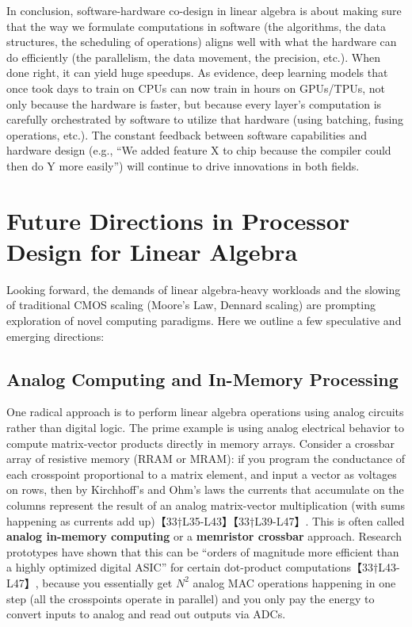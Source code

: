 In conclusion, software-hardware co-design in linear algebra is about making sure that the way we formulate computations in software (the algorithms, the data structures, the scheduling of operations) aligns well with what the hardware can do efficiently (the parallelism, the data movement, the precision, etc.). When done right, it can yield huge speedups. As evidence, deep learning models that once took days to train on CPUs can now train in hours on GPUs/TPUs, not only because the hardware is faster, but because every layer’s computation is carefully orchestrated by software to utilize that hardware (using batching, fusing operations, etc.). The constant feedback between software capabilities and hardware design (e.g., “We added feature X to chip because the compiler could then do Y more easily”) will continue to drive innovations in both fields.

\section{Future Directions in Processor Design for Linear Algebra}  
Looking forward, the demands of linear algebra-heavy workloads and the slowing of traditional CMOS scaling (Moore’s Law, Dennard scaling) are prompting exploration of novel computing paradigms. Here we outline a few speculative and emerging directions:

\subsection{Analog Computing and In-Memory Processing}  
One radical approach is to perform linear algebra operations using analog circuits rather than digital logic. The prime example is using analog electrical behavior to compute matrix-vector products directly in memory arrays. Consider a crossbar array of resistive memory (RRAM or MRAM): if you program the conductance of each crosspoint proportional to a matrix element, and input a vector as voltages on rows, then by Kirchhoff’s and Ohm’s laws the currents that accumulate on the columns represent the result of an analog matrix-vector multiplication (with sums happening as currents add up)【33†L35-L43】【33†L39-L47】. This is often called \textbf{analog in-memory computing} or a \textbf{memristor crossbar} approach. Research prototypes have shown that this can be “orders of magnitude more efficient than a highly optimized digital ASIC” for certain dot-product computations【33†L43-L47】, because you essentially get $N^2$ analog MAC operations happening in one step (all the crosspoints operate in parallel) and you only pay the energy to convert inputs to analog and read out outputs via ADCs.


